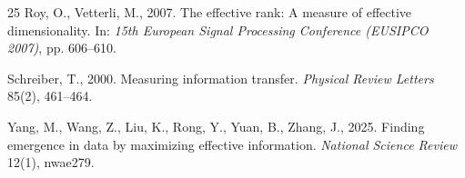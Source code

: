 \documentclass[review,12pt,authoryear]{elsarticle}
\begin{document}
\begin{thebibliography}{25}
Roy, O., Vetterli, M., 2007.
\newblock The effective rank: A measure of effective dimensionality.
\newblock In: \emph{15th European Signal Processing Conference (EUSIPCO 2007)}, pp. 606--610.

Schreiber, T., 2000.
\newblock Measuring information transfer.
\newblock \emph{Physical Review Letters} 85(2), 461--464.

Yang, M., Wang, Z., Liu, K., Rong, Y., Yuan, B., Zhang, J., 2025.
\newblock Finding emergence in data by maximizing effective information.
\newblock \emph{National Science Review} 12(1), nwae279.

\end{thebibliography}
\end{document}

